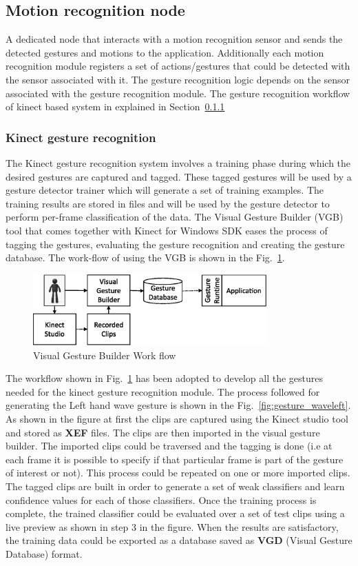 \subsection{Motion recognition node} A dedicated node that interacts with a motion recognition sensor and sends the detected gestures and motions to the application. Additionally each motion recognition module registers a set of actions/gestures that could be detected with the sensor associated with it. The gesture recognition logic depends on the sensor associated with the gesture recognition module. The gesture recognition workflow of kinect based system in explained in Section~\ref{sssec:kinect_gestures}
\subsubsection{Kinect gesture recognition}
\label{sssec:kinect_gestures}
The Kinect gesture recognition system involves a training phase during which the desired gestures are captured and tagged. These tagged gestures will be used by a gesture detector trainer which will generate a set of training examples. The training results are stored in files and will be used by the gesture detector to perform per-frame classification of the data. The Visual Gesture Builder (VGB) tool that comes together with Kinect for Windows SDK eases the process of tagging the gestures, evaluating the gesture recognition and creating the gesture database. The work-flow of using the VGB is shown in the Fig.~\ref{fig:vgb_workflow}.
\begin{figure}[H]
\centering
\includegraphics[width=0.8\textwidth]{assets/vgb_flow.eps}
\caption[Visual Gesture Builder Work flow]{Visual Gesture Builder Work flow \cite{KinectSDK2014}}
\label{fig:vgb_workflow}
\end{figure}
The workflow shown in Fig.~\ref{fig:vgb_workflow} has been adopted to develop all the gestures needed for the kinect gesture recognition module. The process followed for generating the Left hand wave gesture is shown in the Fig.~\ref{fig:gesture_waveleft}. As shown in the figure at first the clips are captured using the Kinect studio tool and  stored as \textbf{XEF} files. The clips are then imported in the visual gesture builder. The imported clips could be traversed and the tagging is done (i.e at each frame it is possible to specify if that particular frame is part of the gesture of interest or not). This process could be repeated on one or more imported clips. The tagged clips are built in order to generate a set of weak classifiers and learn confidence values for each of those classifiers. Once the training process is complete, the trained classifier could be evaluated over a set of test clips using a live preview as shown in step 3 in the figure. When the results are satisfactory, the training data could be exported as a database saved as \textbf{VGD} (Visual Gesture Database) format.
